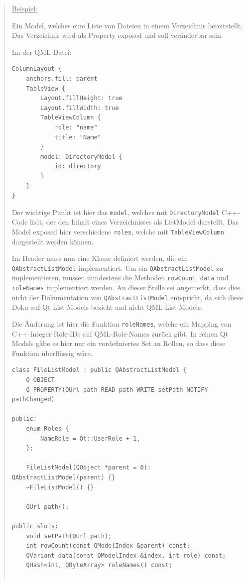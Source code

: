 \documentclass[a4paper]{article}
\begin{document}
\begin{quote}
\uline{Beispiel:}

Ein Model, welches eine Liste von Dateien in einem Verzeichnis bereitstellt. Das Verzeichnis wird als Property exposed und soll veränderbar sein.

Im der QML-Datei:

\begin{verbatim}
ColumnLayout {
    anchors.fill: parent
    TableView {
        Layout.fillHeight: true
        Layout.fillWidth: true
        TableViewColumn {
            role: "name"
            title: "Name"
        }
        model: DirectoryModel {
            id: directory
        }
    }
}
\end{verbatim}

Der wichtige Punkt ist hier das \verb~model~, welches mit \verb~DirectoryModel~ C++-Code lädt, der den Inhalt eines Verzeichnisses als ListModel darstellt. Das Model exposed hier verschiedene \verb~roles~, welche mit \verb~TableViewColumn~ dargestellt werden können.

Im Header muss nun eine Klasse definiert werden, die ein \verb~QAbstractListModel~ implementiert. Um ein \verb~QAbstractListModel~ zu implementieren, müssen mindestens die Methoden \verb~rowCount~, \verb~data~ und \verb~roleNames~ implementiert werden. An dieser Stelle sei angemerkt, dass dies nicht der Dokumentation von \verb~QAbstractListModel~ entspricht, da sich diese Doku auf Qt List-Models bezieht und nicht QML List Models.

Die Änderung ist hier die Funktion \verb~roleNames~, welche ein Mapping von C++-Integer-Role-IDs auf QML-Role-Names zurück gibt. In reinen Qt Models gäbe es hier nur ein vordefiniertes Set an Rollen, so dass diese Funktion überflüssig wäre.

\begin{verbatim}
class FileListModel : public QAbstractListModel {
    Q_OBJECT
    Q_PROPERTY(QUrl path READ path WRITE setPath NOTIFY pathChanged)

public:
    enum Roles {
        NameRole = Qt::UserRole + 1,
    };

    FileListModel(QObject *parent = 0): QAbstractListModel(parent) {}
    ~FileListModel() {}

    QUrl path();

public slots:
    void setPath(QUrl path);
    int rowCount(const QModelIndex &parent) const;
    QVariant data(const QModelIndex &index, int role) const;
    QHash<int, QByteArray> roleNames() const;


\end{verbatim}
\end{quote}
\end{document}
